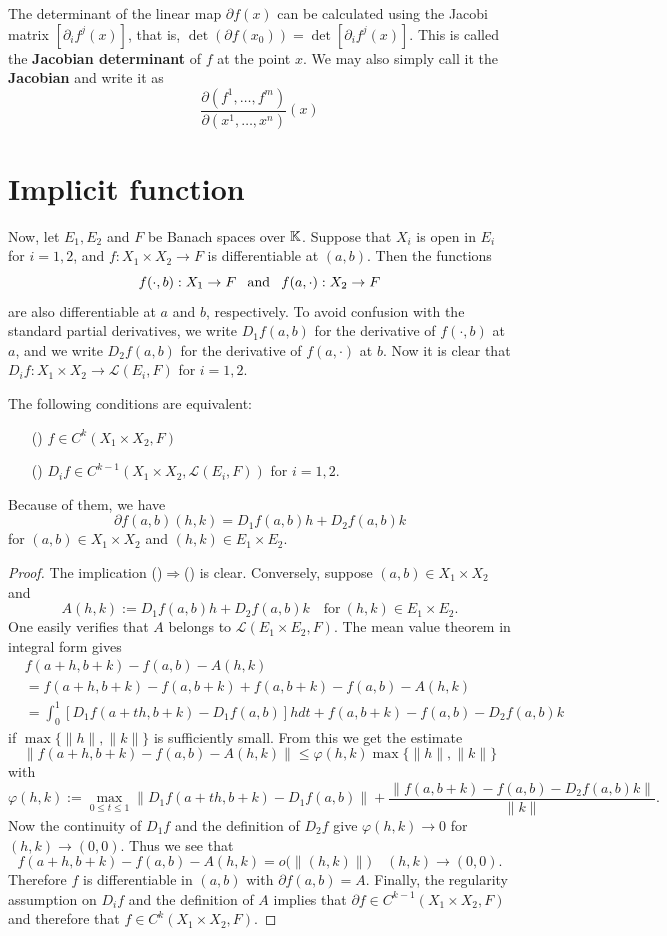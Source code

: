 \begin{remark}
The determinant of the linear map $\partial f(x)$ can be calculated using the Jacobi matrix $[\partial_i f^j(x)]$, that is, $\det(\partial f(x_0))=\det[\partial_if^j(x)]$. This is called the \textbf{Jacobian determinant} of $f$ at the point $x$. We may also simply call it the \textbf{Jacobian} and write it as
\[\dfrac{\partial(f^1,\dots,f^m)}{\partial(x^1,\dots,x^n)}(x)\]
\end{remark}
\section{Implicit function}
Now, let $E_1,E_2$ and $F$ be Banach spaces over $\mathbb{K}$. Suppose that $X_i$ is open in $E_i$ for $i=1,2$, and $f:X_1\times X_2\to F$ is differentiable at $(a,b)$. Then the functions 
\[f(\cdot,b):X_1\to F\hspace{8pt}\text{and}\hspace{8pt} f(a,\cdot):X_2\to F\]
are also differentiable at $a$ and $b$, respectively. To avoid confusion with the standard partial derivatives, we write $D_1f(a,b)$ for the derivative of $f(\cdot,b)$ at $a$, and we write $D_2f(a,b)$ for the derivative of $f(a,\cdot)$ at $b$. Now it is clear that $D_if:X_1\times X_2\to \mathcal{L}(E_i,F)$ for $i=1,2$.
\begin{lemma}\label{diff prod}
The following conditions are equivalent:
\begin{itemize}
\item[(\rmnum{1})]$f\in C^k(X_1\times X_2,F)$
\item[(\rmnum{2})]$D_if\in C^{k-1}(X_1\times X_2,\mathcal{L}(E_i,F))$ for $i=1,2$.
\end{itemize}
Because of them, we have
\[\partial f(a,b)(h,k)=D_1f(a,b)h+D_2f(a,b)k\]
for $(a,b)\in X_1\times X_2$ and $(h,k)\in E_1\times E_2$.
\end{lemma}
\begin{proof}
The implication ()$\Rightarrow$() is clear. Conversely, suppose $(a,b)\in X_1\times X_2$ and
\[A(h,k):=D_1f(a,b)h+D_2f(a,b)k\quad\text{for}\ (h,k)\in E_1\times E_2.\]
One easily verifies that $A$ belongs to $\mathcal{L}(E_1\times E_2,F)$. The mean value theorem in integral form gives
\begin{align*}
&f(a+h,b+k)-f(a,b)-A(h,k)\\
&=f(a+h,b+k)-f(a,b+k)+f(a,b+k)-f(a,b)-A(h,k)\\
&=\int_{0}^{1}[D_1f(a+th,b+k)-D_1f(a,b)]hdt+f(a,b+k)-f(a,b)-D_2f(a,b)k
\end{align*}
if $\max\{\|h\|,\|k\|\}$ is sufficiently small. From this we get the estimate
\[\|f(a+h,b+k)-f(a,b)-A(h,k)\|\leq\varphi(h,k)\max\{\|h\|,\|k\|\}\]
with 
\[\varphi(h,k):=\max_{0\leq t\leq 1}\|D_1f(a+th,b+k)-D_1f(a,b)\|+\dfrac{\|f(a,b+k)-f(a,b)-D_2f(a,b)k\|}{\|k\|}.\]
Now the continuity of $D_1f$ and the definition of $D_2f$ give $\varphi(h,k)\to 0$ for $(h,k)\to(0,0)$. Thus we see that
\[f(a+h,b+k)-f(a,b)-A(h,k)=o\big(\|(h, k)\|\big)\quad (h,k)\to(0,0).\]
Therefore $f$ is differentiable in $(a,b)$ with $\partial f(a,b)=A$. Finally, the regularity assumption on $D_if$ and the definition of $A$ implies that $\partial f\in C^{k-1}(X_1\times X_2,F)$ and therefore that $f\in C^k(X_1\times X_2,F)$.
\end{proof}

